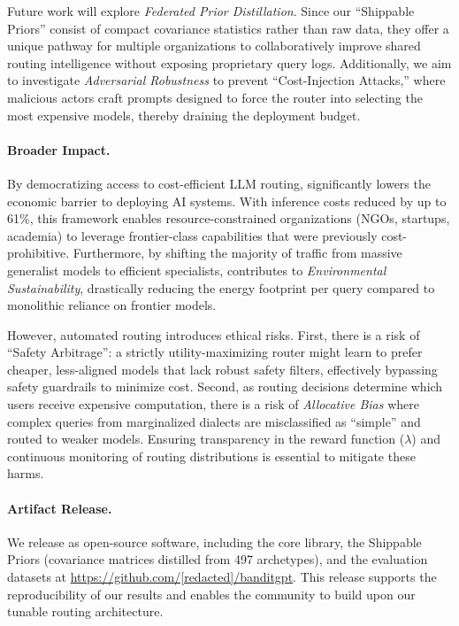 Future work will explore \emph{Federated Prior Distillation}. Since our ``Shippable Priors'' consist of compact covariance statistics rather than raw data, they offer a unique pathway for multiple organizations to collaboratively improve shared routing intelligence without exposing proprietary query logs. Additionally, we aim to investigate \emph{Adversarial Robustness} to prevent ``Cost-Injection Attacks,'' where malicious actors craft prompts designed to force the router into selecting the most expensive models, thereby draining the deployment budget.

\paragraph{Broader Impact.}
By democratizing access to cost-efficient LLM routing, \ours{} significantly lowers the economic barrier to deploying AI systems. With inference costs reduced by up to 61\%, this framework enables resource-constrained organizations (NGOs, startups, academia) to leverage frontier-class capabilities that were previously cost-prohibitive. Furthermore, by shifting the majority of traffic from massive generalist models to efficient specialists, \ours{} contributes to \emph{Environmental Sustainability}, drastically reducing the energy footprint per query compared to monolithic reliance on frontier models.

However, automated routing introduces ethical risks. First, there is a risk of ``Safety Arbitrage'': a strictly utility-maximizing router might learn to prefer cheaper, less-aligned models that lack robust safety filters, effectively bypassing safety guardrails to minimize cost. Second, as routing decisions determine which users receive expensive computation, there is a risk of \emph{Allocative Bias} where complex queries from marginalized dialects are misclassified as ``simple'' and routed to weaker models. Ensuring transparency in the reward function ($\lambda$) and continuous monitoring of routing distributions is essential to mitigate these harms.

\paragraph{Artifact Release.}
We release \ours{} as open-source software, including the core library, the Shippable Priors (covariance matrices distilled from 497 archetypes), and the evaluation datasets at \url{https://github.com/[redacted]/banditgpt}. This release supports the reproducibility of our results and enables the community to build upon our tunable routing architecture.
